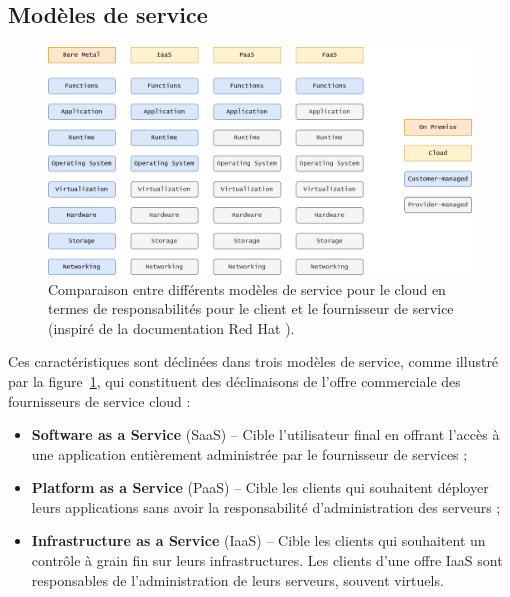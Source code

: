\subsection{Modèles de service}

\begin{figure}[htbp]
    \centering
	\includegraphics[width=\textwidth]{2_Chapitre2/figures/service-models.png}
	\caption[Comparaison entre différents modèles de service pour le cloud en termes de responsabilités pour le client et le fournisseur de service.]{Comparaison entre différents modèles de service pour le cloud en termes de responsabilités pour le client et le fournisseur de service (inspiré de la documentation Red Hat \protect \footnotemark).}
	\label{fig:service-model}
\end{figure}


Ces caractéristiques sont déclinées dans trois modèles de service, comme illustré par la figure~\ref{fig:service-model}, qui constituent des déclinaisons de l'offre commerciale des fournisseurs de service cloud :

\begin{itemize}
    \item \textbf{Software as a Service} (SaaS) -- Cible l'utilisateur final en offrant l'accès à une application entièrement administrée par le fournisseur de services ;
    \item \textbf{Platform as a Service} (PaaS) -- Cible les clients qui souhaitent déployer leurs applications sans avoir la responsabilité d'administration des serveurs ;
    \item \textbf{Infrastructure as a Service} (IaaS) -- Cible les clients qui souhaitent un contrôle à grain fin sur leurs infrastructures. Les clients d'une offre IaaS sont responsables de l'administration de leurs serveurs, souvent virtuels. 
\end{itemize}

